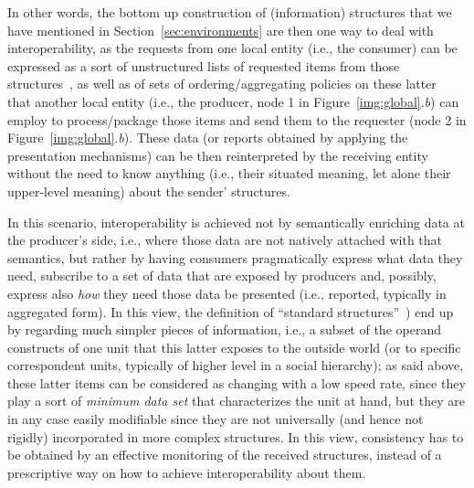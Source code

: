 \documentclass{article}
\begin{document}
In other words, the bottom up construction of (information) structures that we have mentioned in Section~\ref{sec:environments} are then one way to deal with interoperability, as the requests from one local entity (i.e., the consumer) can be expressed as a sort of unstructured lists of requested items from those structures~\citep[as depicted in the squared balloons in Figure~\ref{img:global}.\textit{b}][]{simone_adaptability_2001}, as well as of sets of ordering/aggregating policies on these latter~\citep[see dashed balloons in Figure~\ref{img:global}.\textit{b}][]{cabitza_whatever_2012} that another local entity (i.e., the producer, node 1 in Figure~\ref{img:global}.\textit{b}) can employ to process/package those items and send them to the requester (node 2 in Figure~\ref{img:global}.\textit{b}). These data (or reports obtained by applying the presentation mechanisms) can be then reinterpreted by the receiving entity without the need to know anything (i.e., their situated meaning, let alone their upper-level meaning) about the sender' structures. 

In this scenario, interoperability is achieved not by semantically enriching data at the producer's side, i.e., where those data are not natively attached with that semantics, but rather by having consumers pragmatically express what data they need, subscribe to a set of data that are exposed by producers and, possibly, express also \emph{how} they need those data be presented (i.e., reported, typically in aggregated form). In this view, the definition of ``standard structures''~\citep[which play the role of boundary objects][]{star_sorting_1999}) end up by regarding much simpler pieces of information, i.e., a subset of the operand constructs of one unit that this latter exposes to the outside world (or to specific correspondent units, typically of higher level in a social hierarchy); as said above, these latter items can be considered as changing with a low speed rate, since they play a sort of \emph{minimum data set} that characterizes the unit at hand, but they are in any case easily modifiable since they are not universally (and hence not rigidly) incorporated in more complex structures. In this view, consistency has to be obtained by an effective monitoring of the received structures, instead of a prescriptive way on how to achieve interoperability about them.
\end{document}
